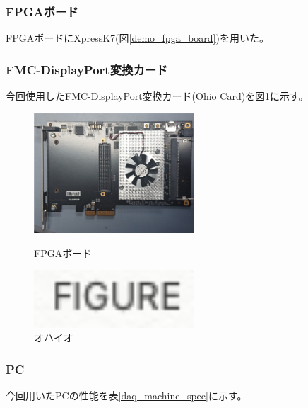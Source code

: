 \subsubsection{FPGAボード}
FPGAボードにXpressK7\cite{5-2}(図\ref{demo_fpga_board})を用いた。

\subsubsection{FMC-DisplayPort変換カード}
今回使用したFMC-DisplayPort変換カード(Ohio Card)を図\ref{demo_ohio}に示す。

\begin{figure}[htbp]
 \begin{minipage}{0.5\hsize}
  \begin{center}
   \includegraphics[width=60mm]{fpga_board}
  \end{center}
  \caption[FPGAボード]{FPGAボード}
  \label{demo_fpga_board}
 \end{minipage}
 \begin{minipage}{0.5\hsize}
  \begin{center}
   \includegraphics[width=60mm]{figure}
  \end{center}
  \caption[オハイオ]{オハイオ}
  \label{demo_ohio}
 \end{minipage}
\end{figure}

\subsubsection{PC}
今回用いたPCの性能を表\ref{daq_machine_spec}に示す。
\begin{table}[tbp]
\begin{center}
\caption[]{}
\label{daq_machine_spec}
\end{center}
\end{table}


